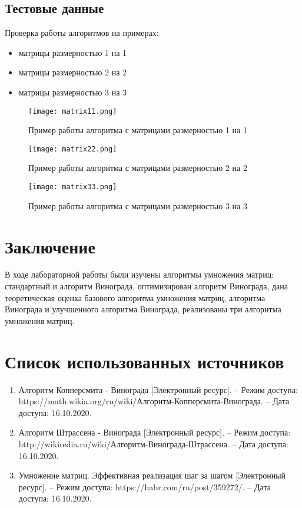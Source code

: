 \documentclass[12pt]{report}
\begin{document}
\section{Тестовые данные}

Проверка работы алгоритмов на примерах:
\begin{itemize}
	\item матрицы размерностью 1 на 1
	\item матрицы размерностью 2 на 2
	\item матрицы размерностью 3 на 3
\end{itemize}

\begin{figure}[h]
\centering
\texttt{[image: matrix11.png]}
\caption{Пример работы алгоритма с матрицами размерностью 1 на 1}
\label{fig:mpr}
\end{figure}

\begin{figure}[h]
\centering
\texttt{[image: matrix22.png]}
\caption{Пример работы алгоритма с матрицами размерностью 2 на 2}
\label{fig:mpr}
\end{figure}

\begin{figure}[h]
\centering
\texttt{[image: matrix33.png]}
\caption{Пример работы алгоритма с матрицами размерностью 3 на 3}
\label{fig:mpr}
\end{figure}





\chapter*{Заключение}
В ходе лабораторной работы были изучены алгоритмы умножения матриц: стандартный и алгоритм Винограда, оптимизирован алгоритм Винограда, дана теоретическая оценка базового алгоритма умножения матриц, алгоритма Винограда и улучшенного алгоритма Винограда, реализованы три алгоритма умножения матриц.



\chapter*{Список использованных источников}
\begin{enumerate}
	\item Алгоритм Копперсмита - Винограда [Электронный ресурс]. – Режим доступа: https://math.wikia.org/ru/wiki/Алгоритм-Копперсмита-Винограда. – Дата доступа: 16.10.2020.
	\item Алгоритм Штрассена - Винограда [Электронный ресурс]. – Режим доступа: http://wikiredia.ru/wiki/Алгоритм-Винограда-Штрассена. – Дата доступа: 16.10.2020.
	\item Умножение матриц. Эффективная реализация шаг за шагом [Электронный ресурс]. – Режим доступа: https://habr.com/ru/post/359272/. – Дата доступа: 16.10.2020.
\end{enumerate}
\end{document}
